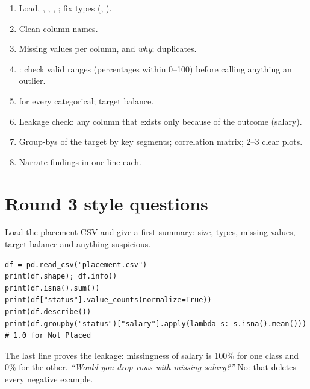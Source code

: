 \begin{practical}
\begin{enumerate}
\item Load, , , , ; fix types (, ).
\item Clean column names.
\item Missing values per column, and \emph{why}; duplicates.
\item {}: check valid ranges (percentages within 0--100) before calling anything an outlier.
\item {} for every categorical; target balance.
\item Leakage check: any column that exists only because of the outcome (salary).
\item Group-bys of the target by key segments; correlation matrix; 2--3 clear plots.
\item Narrate findings in one line each.
\end{enumerate}
\end{practical}

\section{Round 3 style questions}

\begin{qa}{ Load the placement CSV and give a first summary: size, types, missing values, target balance and anything suspicious.}
\why
\begin{lstlisting}
df = pd.read_csv("placement.csv")
print(df.shape); df.info()
print(df.isna().sum())
print(df["status"].value_counts(normalize=True))
print(df.describe())
print(df.groupby("status")["salary"].apply(lambda s: s.isna().mean()))  # 1.0 for Not Placed
\end{lstlisting}
The last line proves the leakage: missingness of salary is 100\% for one class and 0\% for the other.
\pushes \emph{``Would you drop rows with missing salary?''} No: that deletes every negative example.
\end{qa}

